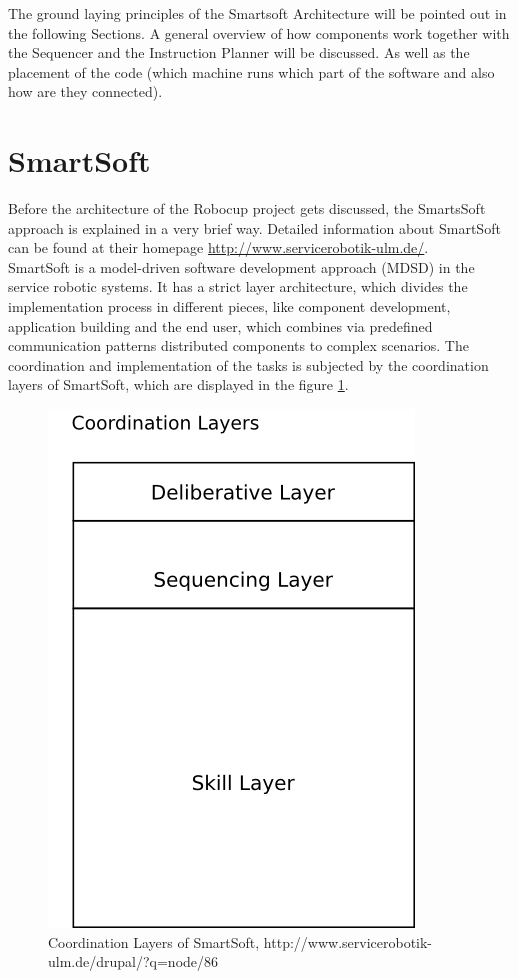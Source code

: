The ground laying principles of the Smartsoft Architecture will be pointed out in the following
Sections. A general overview of how components work together with the Sequencer and the Instruction Planner will be discussed.
As well as the placement of the code (which machine runs which part of the software and also how are they connected).

\section{SmartSoft}
Before the architecture of the Robocup project gets discussed, the SmartsSoft approach is explained in a very brief way. Detailed information about SmartSoft can be found at their homepage \url{http://www.servicerobotik-ulm.de/}.  
\\
SmartSoft is a model-driven software development approach (MDSD) in the service robotic systems. It has a strict layer architecture, which divides the implementation process in different pieces, like component development, application building and the end user, which combines via predefined communication patterns distributed components to complex scenarios.
The coordination and implementation of the tasks is subjected by the coordination layers of SmartSoft, which are displayed in the figure \ref{fig:architecture_smartsoft_layers}. 

\begin{figure}[h]
\centering
\includegraphics[scale=1.0]{pic/coordination_layers_smartsoft.png}
\caption{Coordination Layers of SmartSoft, http://www.servicerobotik-ulm.de/drupal/?q=node/86}
\label{fig:architecture_smartsoft_layers}
\end{figure}


